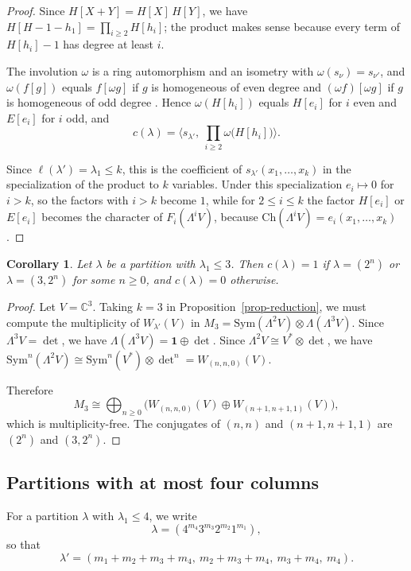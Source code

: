 \documentclass[reqno]{amsart}
\theoremstyle{plain}
\newtheorem{corollary}[theorem]{Corollary}
\theoremstyle{definition}
\theoremstyle{remark}
\theoremstyle{plain}
\newcommand{\C}{\mathbb{C}}
\begin{document}
\begin{proof}
Since $H[X+Y]=H[X]\,H[Y]$, we have $H[H-1-h_1]=\prod_{i\ge2}H[h_i]$; the
product makes sense because every term of $H[h_i]-1$ has degree at least $i$.

\smallskip
The involution $\omega$ is a ring automorphism and an isometry with
$\omega(s_\nu)=s_{\nu'}$, and $\omega(f[g])$ equals $f[\omega g]$ if $g$ is
homogeneous of even degree and $(\omega f)[\omega g]$ if $g$ is homogeneous of
odd degree \cite[Ch.~I, \S8]{macdonald}. Hence $\omega(H[h_i])$ equals
$H[e_i]$ for $i$ even and $E[e_i]$ for $i$ odd, and
$$c(\lambda)=\Big\langle s_{\lambda'},\ \prod_{i\ge2}\omega\big(H[h_i]\big)\Big\rangle.$$

\smallskip
Since $\ell(\lambda')=\lambda_1\le k$, this is the coefficient of
$s_{\lambda'}(x_1,\dots,x_k)$ in the specialization of the product to $k$
variables. Under this specialization $e_i\mapsto0$ for $i>k$, so the factors
with $i>k$ become $1$, while for $2\le i\le k$ the factor $H[e_i]$ or $E[e_i]$
becomes the character of $F_i(\Lambda^iV)$, because
$\mathrm{Ch}(\Lambda^iV)=e_i(x_1,\dots,x_k)$.
\end{proof}

\begin{corollary}\label{cor-three-columns}
Let $\lambda$ be a partition with $\lambda_1\le3$. Then $c(\lambda)=1$ if
$\lambda=(2^n)$ or $\lambda=(3,2^n)$ for some $n\ge0$, and $c(\lambda)=0$
otherwise.
\end{corollary}

\begin{proof}
Let $V=\C^3$. Taking $k=3$ in Proposition~\ref{prop-reduction}, we must
compute the multiplicity of $W_{\lambda'}(V)$ in
$M_3=\mathrm{Sym}(\Lambda^2V)\otimes\Lambda(\Lambda^3V)$. Since
$\Lambda^3V=\det$, we have $\Lambda(\Lambda^3V)=\mathbf 1\oplus\det$. Since
$\Lambda^2V\cong V^*\otimes\det$, we have
$\mathrm{Sym}^n(\Lambda^2V)\cong\mathrm{Sym}^n(V^*)\otimes{\det}^n=W_{(n,n,0)}(V)$.

\smallskip
Therefore
$$M_3\cong\bigoplus_{n\ge0}\Big(W_{(n,n,0)}(V)\oplus W_{(n+1,n+1,1)}(V)\Big),$$
which is multiplicity-free. The conjugates of $(n,n)$ and $(n+1,n+1,1)$ are
$(2^n)$ and $(3,2^n)$.
\end{proof}

\subsection{Partitions with at most four columns}

For a partition $\lambda$ with $\lambda_1\le4$, we write
$$\lambda=(4^{m_4}3^{m_3}2^{m_2}1^{m_1}),$$
so that
$$\lambda'=(m_1+m_2+m_3+m_4,\ m_2+m_3+m_4,\ m_3+m_4,\ m_4).$$
\end{document}
